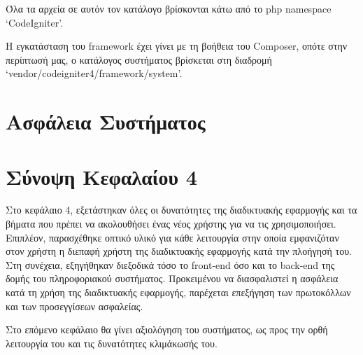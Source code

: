 Όλα τα αρχεία σε αυτόν τον κατάλογο βρίσκονται κάτω από το php namespace `CodeIgniter'.

Η εγκατάσταση του framework έχει γίνει με τη βοήθεια του Composer, οπότε στην περίπτωσή μας, ο κατάλογος συστήματος βρίσκεται στη διαδρομή `vendor/codeigniter4/framework/system'.

\section{Ασφάλεια Συστήματος}

\section{Σύνοψη Κεφαλαίου 4}
Στο κεφάλαιο 4, εξετάστηκαν όλες οι δυνατότητες της διαδικτυακής εφαρμογής και τα βήματα που πρέπει να ακολουθήσει ένας νέος χρήστης για να τις χρησιμοποιήσει. Επιπλέον, παρασχέθηκε οπτικό υλικό για κάθε λειτουργία στην οποία εμφανιζόταν στον χρήστη η διεπαφή χρήστη της διαδικτυακής εφαρμογής κατά την πλοήγησή του. Στη συνέχεια, εξηγήθηκαν διεξοδικά τόσο το front-end όσο και το back-end της δομής του πληροφοριακού συστήματος. Προκειμένου να διασφαλιστεί η ασφάλεια κατά τη χρήση της διαδικτυακής εφαρμογής, παρέχεται επεξήγηση των πρωτοκόλλων και των προσεγγίσεων ασφαλείας.

Στο επόμενο κεφάλαιο θα γίνει αξιολόγηση του συστήματος, ως προς την ορθή λειτουργία του και τις δυνατότητες κλιμάκωσής του.

